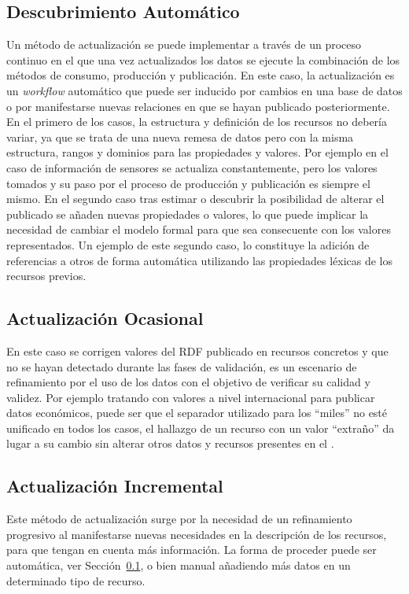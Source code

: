\subsection{Descubrimiento Automático}\label{sect:desc-auto}
Un método de actualización se puede implementar a través de un proceso 
continuo en el que una vez actualizados los datos se ejecute la combinación
de los métodos de consumo, producción y publicación. En este caso, la actualización
es un \textit{workflow} automático que puede ser inducido por cambios en una base
de datos o por manifestarse nuevas relaciones en \datasets que se hayan publicado
posteriormente. En el primero de los casos, la estructura y definición de los recursos
no debería variar, ya que se trata de una nueva remesa de datos pero con la misma estructura, 
rangos y dominios para las propiedades y valores. Por ejemplo en el caso de información
de sensores se actualiza constantemente, pero los valores tomados y su paso por el proceso
de producción y publicación es siempre el mismo. En el segundo caso tras estimar o
descubrir la posibilidad de alterar el \dataset publicado se añaden nuevas propiedades
o valores, lo que puede implicar la necesidad de cambiar el modelo formal para que
sea consecuente con los valores representados. Un ejemplo de este segundo caso, lo constituye la adición de referencias a otros \datasets de forma automática utilizando
las propiedades léxicas de los recursos previos.
\subsection{Actualización Ocasional}
En este caso se corrigen valores del \dataset \gls{RDF} publicado en recursos concretos y que no 
se hayan detectado durante las fases de validación, es un escenario de refinamiento por el uso
de los datos con el objetivo de verificar su calidad y validez. Por ejemplo tratando con 
valores a nivel internacional para publicar datos económicos, puede ser que el separador
utilizado para los ``miles'' no esté unificado en todos los casos, el hallazgo de 
un recurso con un valor ``extraño'' da lugar a su cambio sin alterar otros datos
y recursos presentes en el \dataset.
\subsection{Actualización Incremental}
Este método de actualización surge por la necesidad de un refinamiento progresivo
al manifestarse nuevas necesidades en la descripción de los recursos, para que tengan
en cuenta más información. La forma de proceder puede ser automática, ver Sección~\ref{sect:desc-auto}, o 
bien manual añadiendo más datos en un determinado tipo de recurso.

